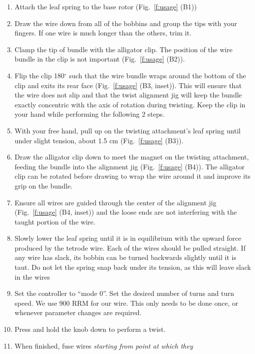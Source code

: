 \documentclass[11pt,a4paper]{article}
\begin{document}
\begin{enumerate}[noitemsep]
    \item Attach the leaf spring to the base rotor (Fig.~\ref{f:usage} (B1))
    \item Draw the wire down from all of the bobbins and group the tips with
        your fingers. If one wire is much longer than the others, trim it.
    \item Clamp the tip of bundle with the alligator clip. The position of the
        wire bundle in the clip is not important (Fig.~\ref{f:usage} (B2)).
    \item Flip the clip 180$^{\circ}$ such that the wire bundle wraps around the
        bottom of the clip and exits its rear face (Fig.~\ref{f:usage} (B3,
        inset)). This will ensure that the wire does not slip and that the
        twist alignment jig will keep the bundle exactly concentric with the
        axis of rotation during twisting.  Keep the clip in your hand while
        performing the following 2 steps.
    \item With your free hand, pull up on the twisting attachment's leaf spring
        until under slight tension, about 1.5 cm (Fig.~\ref{f:usage} (B3)).
    \item Draw the alligator clip down to meet the magnet on the twisting
        attachment, feeding the bundle into the alignment jig
        (Fig.~\ref{f:usage} (B4)). The alligator clip can be rotated before
        drawing to wrap the wire around it and improve its grip on the bundle.
    \item Ensure all wires are guided through the center of the alignment jig
        (Fig.~\ref{f:usage} (B4, inset)) and the loose ends are not interfering
        with the taught portion of the wire.
    \item Slowly lower the leaf spring until it is in equilibrium with the
        upward force produced by the tetrode wire. Each of the wires should be
        pulled straight. If any wire has slack, its bobbin can be turned
        backwards slightly until it is taut. Do not let the spring snap back
        under its tension, as this will leave slack in the wires
    \item Set the controller to ``mode 0''. Set the desired number of turns and
        turn speed. We use 900 RRM for our wire. This only needs to be done
        once, or whenever parameter changes are required.
    \item Press and hold the knob down to perform a twist.
    \item When finished, fuse wires \textit{starting from point at which they
}
\end{enumerate}
\end{document}
